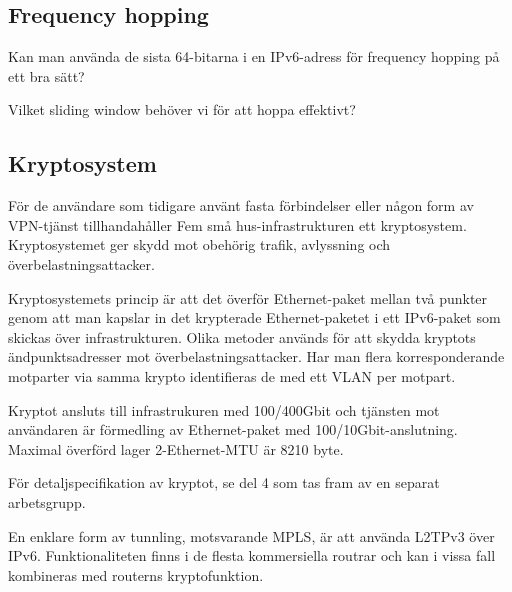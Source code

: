 \documentclass[12pt,a4paper]{article}
\begin{document}
\subsection{Frequency hopping}\label{frequency-hopping}

Kan man använda de sista 64-bitarna i en IPv6-adress för frequency
hopping på ett bra sätt?

Vilket sliding window behöver vi för att hoppa effektivt?

\subsection{Kryptosystem}\label{kryptosystem}

För de användare som tidigare använt fasta förbindelser eller någon form
av VPN-tjänst tillhandahåller Fem små hus-infrastrukturen ett
kryptosystem. Kryptosystemet ger skydd mot obehörig trafik, avlyssning
och överbelastningsattacker.

Kryptosystemets princip är att det överför Ethernet-paket mellan två
punkter genom att man kapslar in det krypterade Ethernet-paketet i ett
IPv6-paket som skickas över infrastrukturen. Olika metoder används för
att skydda kryptots ändpunktsadresser mot överbelastningsattacker. Har
man flera korresponderande motparter via samma krypto identifieras de
med ett VLAN per motpart.

Kryptot ansluts till infrastrukuren med 100/400Gbit och tjänsten mot
användaren är förmedling av Ethernet-paket med 100/10Gbit-anslutning.
Maximal överförd lager 2-Ethernet-MTU är 8210 byte.

För detaljspecifikation av kryptot, se del 4 som tas fram av en separat
arbetsgrupp.

En enklare form av tunnling, motsvarande MPLS, är att använda L2TPv3
över IPv6. Funktionaliteten finns i de flesta kommersiella routrar och
kan i vissa fall kombineras med routerns kryptofunktion.
\end{document}
